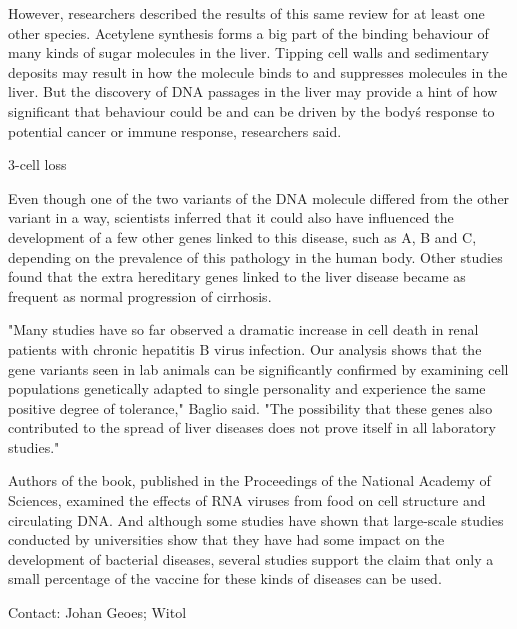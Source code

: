 \documentclass{article}
\begin{document}
However, researchers described the results of this same review for at least one other species. Acetylene synthesis forms a big part of the binding behaviour of many kinds of sugar molecules in the liver. Tipping cell walls and sedimentary deposits may result in how the molecule binds to and suppresses molecules in the liver. But the discovery of DNA passages in the liver may provide a hint of how significant that behaviour could be and can be driven by the body\'s response to potential cancer or immune response, researchers said.

3-cell loss

Even though one of the two variants of the DNA molecule differed from the other variant in a way, scientists inferred that it could also have influenced the development of a few other genes linked to this disease, such as A, B and C, depending on the prevalence of this pathology in the human body. Other studies found that the extra hereditary genes linked to the liver disease became as frequent as normal progression of cirrhosis.

"Many studies have so far observed a dramatic increase in cell death in renal patients with chronic hepatitis B virus infection. Our analysis shows that the gene variants seen in lab animals can be significantly confirmed by examining cell populations genetically adapted to single personality and experience the same positive degree of tolerance," Baglio said. "The possibility that these genes also contributed to the spread of liver diseases does not prove itself in all laboratory studies."

Authors of the book, published in the Proceedings of the National Academy of Sciences, examined the effects of RNA viruses from food on cell structure and circulating DNA. And although some studies have shown that large-scale studies conducted by universities show that they have had some impact on the development of bacterial diseases, several studies support the claim that only a small percentage of the vaccine for these kinds of diseases can be used.

Contact: Johan Geoes; Witol
\end{document}
